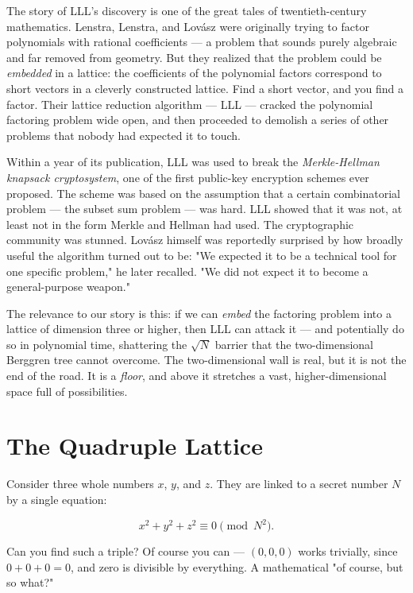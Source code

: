 \documentclass[11pt,twoside,openright]{book}
\theoremstyle{definition}
\theoremstyle{remark}
\begin{document}
The story of LLL's discovery is one of the great tales of twentieth-century mathematics. Lenstra, Lenstra, and Lovász were originally trying to factor polynomials with rational coefficients --- a problem that sounds purely algebraic and far removed from geometry. But they realized that the problem could be \textit{embedded} in a lattice: the coefficients of the polynomial factors correspond to short vectors in a cleverly constructed lattice. Find a short vector, and you find a factor. Their lattice reduction algorithm --- LLL --- cracked the polynomial factoring problem wide open, and then proceeded to demolish a series of other problems that nobody had expected it to touch.

Within a year of its publication, LLL was used to break the \textit{Merkle-Hellman knapsack cryptosystem}, one of the first public-key encryption schemes ever proposed. The scheme was based on the assumption that a certain combinatorial problem --- the subset sum problem --- was hard. LLL showed that it was not, at least not in the form Merkle and Hellman had used. The cryptographic community was stunned. Lovász himself was reportedly surprised by how broadly useful the algorithm turned out to be: "We expected it to be a technical tool for one specific problem," he later recalled. "We did not expect it to become a general-purpose weapon."

The relevance to our story is this: if we can \textit{embed} the factoring problem into a lattice of dimension three or higher, then LLL can attack it --- and potentially do so in polynomial time, shattering the $\sqrt{N}$ barrier that the two-dimensional Berggren tree cannot overcome. The two-dimensional wall is real, but it is not the end of the road. It is a \textit{floor}, and above it stretches a vast, higher-dimensional space full of possibilities.


\section{The Quadruple Lattice}

Consider three whole numbers $x$, $y$, and $z$. They are linked to a secret number $N$ by a single equation:

\[x^2 + y^2 + z^2 \equiv 0 \pmod{N^2}.\]

Can you find such a triple? Of course you can --- $(0, 0, 0)$ works trivially, since $0 + 0 + 0 = 0$, and zero is divisible by everything. A mathematical "of course, but so what?"
\end{document}
